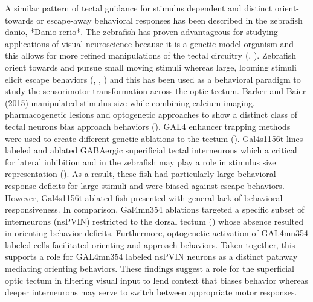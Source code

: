 \documentclass{ar-1col}
\begin{document}
A similar pattern of tectal guidance for stimulus dependent and distinct orient-towards or escape-away behavioral responses has been described in the zebrafish danio, *Danio rerio*. The zebrafish has proven advantageous for studying applications of visual neuroscience because it is a genetic model organism and this allows for more refined manipulations of the tectal circuitry (\cite{bilotta2001zebrafish}, \cite{mcarthur2020zebrafish}). Zebrafish orient towards and pursue small moving stimuli whereas large, looming stimuli elicit escape behaviors (\cite{bianco2011prey}, \cite{temizer2015visual}, \cite{dunn2016neural}) and this has been used as a behavioral paradigm to study the sensorimotor transformation across the optic tectum. Barker and Baier (2015) manipulated stimulus size while combining calcium imaging, pharmacogenetic lesions and optogenetic approaches to show a distinct class of tectal neurons bias approach behaviors (\cite{barker2015sensorimotor}). GAL4 enhancer trapping methods were used to create different genetic ablations to the tectum (\cite{scott2007targeting}). Gal4s1156t lines labeled and ablated GABAergic superificial tectal interneurons which a critical for lateral inhibition and in the zebrafish may play a role in stimulus size representation (\cite{preuss2014classification}). As a result, these fish had particularly large behavioral response deficits for large stimuli and were biased against escape behaviors. However, Gal4s1156t ablated fish presented with general lack of behavioral responsiveness. In comparison, Gal4mn354 ablations targeted a specific subset of interneurons (nsPVIN) restricted to the dorsal tectum (\cite{nevin2010focusing}) whose absence resulted in orienting behavior deficits. Furthermore, optogenetic activation of GAL4mn354 labeled cells facilitated orienting and approach behaviors. Taken together, this supports a role for GAL4mn354 labeled nsPVIN neurons as a distinct pathway mediating orienting behaviors. These findings suggest a role for the superficial optic tectum in filtering visual input to lend context that biases behavior whereas deeper interneurons may serve to switch between appropriate motor responses.  
\end{document}
